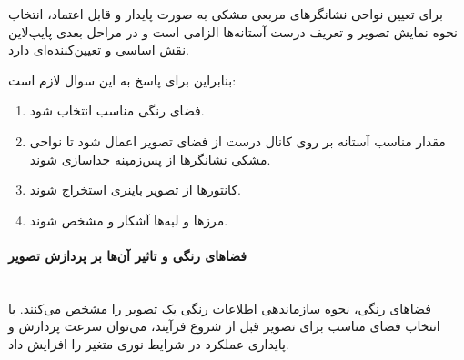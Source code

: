\documentclass{article}
\begin{document}
برای تعیین نواحی نشانگرهای مربعی مشکی به صورت پایدار و قابل اعتماد، انتخاب نحوه نمایش تصویر و تعریف درست آستانه‌ها الزامی است و در مراحل بعدی پایپ‌لاین نقش اساسی و تعیین‌کننده‌ای دارد.

بنابراین برای پاسخ به این سوال لازم است:
\begin{enumerate}
\item فضای رنگی مناسب انتخاب شود.
\item مقدار مناسب آستانه بر روی کانال درست از فضای تصویر اعمال شود تا نواحی مشکی نشانگرها از پس‌زمینه جداسازی شوند.
\item کانتورها از تصویر باینری استخراج شوند.
\item مرز‌ها و لبه‌ها آشکار و مشخص شوند.
\end{enumerate}

\paragraph{فضاهای رنگی  و تاثیر آن‌ها بر پردازش تصویر}\mbox{}\\
فضاهای رنگی، نحوه سازماندهی اطلاعات رنگی یک تصویر را مشخص می‌کنند. با انتخاب فضای مناسب برای تصویر قبل از شروع فرآیند، می‌توان سرعت پردازش و پایداری عملکرد در شرایط نوری متغیر را افزایش داد.
\end{document}
